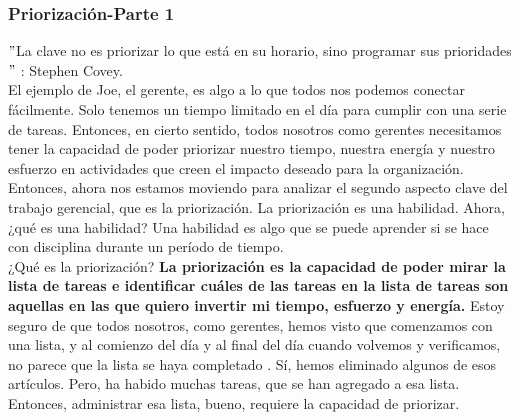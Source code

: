 \documentclass[10pt]{book}
\begin{document}
\subsubsection{Priorización-Parte 1}
$"$La clave no es priorizar lo que está en su horario, sino programar sus prioridades$"$ : Stephen Covey.\\
El ejemplo de Joe, el gerente, es algo a lo que todos nos podemos conectar fácilmente. Solo tenemos un tiempo limitado en el día para cumplir con una serie de tareas. Entonces, en cierto sentido, todos nosotros como gerentes necesitamos tener la capacidad de poder priorizar nuestro tiempo, nuestra energía y nuestro esfuerzo en actividades que creen el impacto deseado para la organización.\\
Entonces, ahora nos estamos moviendo para analizar el segundo aspecto clave del trabajo gerencial, que es la priorización. La priorización es una habilidad. Ahora, ¿qué es una habilidad? Una habilidad es algo que se puede aprender si se hace con disciplina durante un período de tiempo.\\
¿Qué es la priorización? \textbf{La priorización es la capacidad de poder mirar la lista de tareas e identificar cuáles de las tareas en la lista de tareas son aquellas en las que quiero invertir mi tiempo, esfuerzo y energía.} Estoy seguro de que todos nosotros, como gerentes, hemos visto que comenzamos con una lista, y al comienzo del día y al final del día cuando volvemos y verificamos, no parece que la lista se haya completado . Sí, hemos eliminado algunos de esos artículos. Pero, ha habido muchas tareas, que se han agregado a esa lista. Entonces, administrar esa lista, bueno, requiere la capacidad de priorizar.
\end{document}
